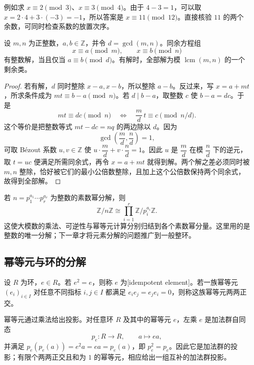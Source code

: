 \ProseParagraphBreak
例如求 \(x\equiv2\pmod3\)、\(x\equiv3\pmod4\)。由于 \(4-3=1\)，可以取 \(x=2\cdot4+3\cdot(-3)=-1\)，所以答案是 \(x\equiv11\pmod{12}\)。直接核验 \(11\) 的两个余数，可同时检查系数的放置次序。

\begin{proposition}\label{b1:prop:integer-crt-compatible}
	设 \(m,n\) 为正整数，\(a,b\in\mathbb Z\)，并令 \(d=\gcd(m,n)\)。同余方程组
	\[
		x\equiv a\pmod m,\qquad x\equiv b\pmod n
	\]
	有整数解，当且仅当 \(a\equiv b\pmod d\)。有解时，全部解为模 \(\operatorname{lcm}(m,n)\) 的一个剩余类。
\end{proposition}
\begin{proof}
	若有解，\(d\) 同时整除 \(x-a,x-b\)，所以整除 \(a-b\)。反过来，写 \(x=a+mt\)，所求条件成为 \(mt\equiv b-a\pmod n\)。若 \(d\mid b-a\)，取整数 \(c\) 使 \(b-a=dc\)。于是
	\[
		mt\equiv dc\pmod n \quad\Longleftrightarrow\quad \frac md\,t\equiv c\pmod{n/d}.
	\]
	这个等价是把整数等式 \(mt-dc=nq\) 的两边除以 \(d\)。因为
	\[
		\gcd\left(\frac md,\frac nd\right)=1,
	\]
	可取 Bézout 系数 \(u,v\in\mathbb Z\) 使 \(u\cdot\dfrac md+v\cdot\dfrac nd=1\)。因此 \(u\) 是 \(\dfrac md\) 在模 \(\dfrac nd\) 下的逆元，取 \(t=uc\) 便满足所需同余式，再令 \(x=a+mt\) 就得到解。两个解之差必须同时被 \(m,n\) 整除，恰好被它们的最小公倍数整除，且加上这个公倍数保持两个同余式，故得到全部解。
\end{proof}
若 \(n=p_1^{a_1}\cdots p_r^{a_r}\) 为整数的素数幂分解，则
\[
	\mathbb Z/n\mathbb Z\cong\prod_{i=1}^r\mathbb Z/p_i^{a_i}\mathbb Z.
\]
这使大模数的乘法、可逆性与幂等元计算分别归结到各个素数幂分量。这里用的是整数的唯一分解；下一章才将元素分解的问题推广到一般整环。

\subsection{幂等元与环的分解}
\label{b1:subsec:1004:03}
\begin{definition}\label{b1:def:idempotent}
	设 \(R\) 为环，\(e\in R\)。若 \(e^2=e\)，则称 \(e\) 为[idempotent element]。若一族幂等元 \((e_i)_{i\in I}\) 对任意不同指标 \(i,j\in I\) 都满足 \(e_ie_j=e_je_i=0\)，则称这族幂等元两两正交。
\end{definition}

幂等元通过乘法给出投影。对任意环 \(R\) 及其中的幂等元 \(e\)，左乘 \(e\) 是加法群自同态
\[
	p_e:R\longrightarrow R,\qquad a\longmapsto ea,
\]
并满足 \(p_e(p_e(a))=e^2a=ea=p_e(a)\)，即 \(p_e^2=p_e\)。因此它是加法群的投影；有限个两两正交且和为 \(1\) 的幂等元，相应给出一组互补的加法群投影。

